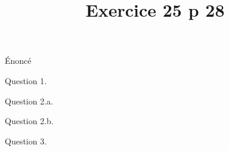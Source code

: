\documentclass[handout,%
french,onlymath]{beamer}
\title{Exercice 25 p 28}
\author{\tmaths}\institute{\augustin{0.2}}
\date{}
\begin{document}



\begin{frame}
 \titlepage
\end{frame}
\begin{frame}{Énoncé}



\end{frame}
\begin{frame}{Question 1.}


\end{frame}
\begin{frame}{Question 2.a.}


\end{frame}
\begin{frame}{Question 2.b.}



\end{frame}
\begin{frame}{Question 3.}



\end{frame}


\end{document}
